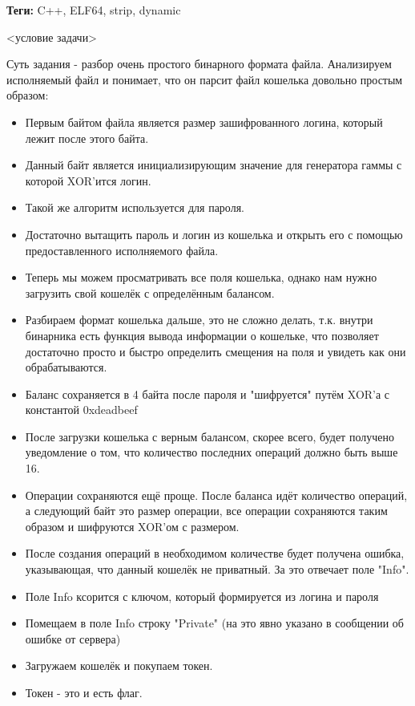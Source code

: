\documentclass[idxtotoc,hyperref,openany,oneside]{files/reverse} %
\begin{document}



\textbf{Теги:} C++, ELF64, strip, dynamic\vspace{\baselineskip}

\begin{tcolorbox}
<условие задачи>
\end{tcolorbox}

Суть задания - разбор очень простого бинарного формата файла. Анализируем исполняемый файл и понимает, что он парсит файл кошелька довольно простым образом:
\begin{itemize}
\item Первым байтом файла является размер зашифрованного логина, который лежит после этого байта.
\item Данный байт является инициализирующим значение для генератора гаммы с которой XOR'ится логин.
\item Такой же алгоритм используется для пароля.
\item Достаточно вытащить пароль и логин из кошелька и открыть его с помощью предоставленного исполняемого файла.
\item Теперь мы можем просматривать все поля кошелька, однако нам нужно загрузить свой кошелёк с определённым балансом.
\item Разбираем формат кошелька дальше, это не сложно делать, т.к. внутри бинарника есть функция вывода информации о кошельке, что позволяет достаточно просто и быстро определить смещения на поля и увидеть как они обрабатываются.
\item Баланс сохраняется в 4 байта после пароля и "шифруется" путём XOR'а с константой 0xdeadbeef
\item После загрузки кошелька с верным балансом, скорее всего, будет получено уведомление о том, что количество последних операций должно быть выше 16.
\item Операции сохраняются ещё проще. После баланса идёт количество операций, а следующий байт это размер операции, все операции сохраняются таким образом и шифруются XOR'ом с размером.
\item После создания операций в необходимом количестве будет получена ошибка, указывающая, что данный кошелёк не приватный. За это отвечает поле "Info".
\item Поле Info ксорится с ключом, который формируется из логина и пароля
\item Помещаем в поле Info строку "Private" (на это явно указано в сообщении об ошибке от сервера)
\item Загружаем кошелёк и покупаем токен.
\item Токен - это и есть флаг.
\end{itemize}
\end{document}
